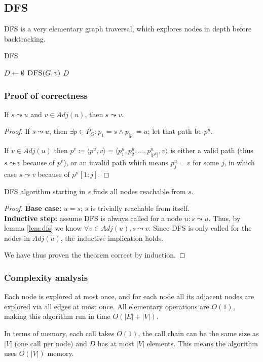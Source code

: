 \subsection{\texorpdfstring{\Acrlong*{DFS}}{Depth-first search}} \label{algorithm-reachability-dfs}
\Acrlong*{DFS} is a very elementary graph traversal, which explores nodes in depth before backtracking.
\begin{algorithm}[h]
    \caption{\Acrlong*{DFS}}
    \label{alg-dfs}
    \begin{algorithmic}[1]
        \State $D \gets \emptyset$
             \Return {$ $}
            \EndIf 
             {$\Call{DFS}{G, v}$}
            \EndFor
            \State \Return $D$
        \EndFunction
    \end{algorithmic}
\end{algorithm}
\subsubsection{Proof of correctness}
\begin{lemma} \label{lem:dfs}
    If $s \leadsto u$ and $v \in Adj(u)$, then $s \leadsto v$.
\end{lemma}
\begin{proof}
    If $s \leadsto u$, then $\exists p \in P_G \colon p_1 = s \wedge p_{|p|} = u$; let that path be $p^u$.\par
    If $v \in Adj(u)$ then $p^v \coloneqq \langle p^u, v \rangle = \langle p^u_1, p^u_2,...,p^u_{|p^u|}, v\rangle$ is either a valid path (thus $s \leadsto v$ because of $p^v$), or an invalid path which means $p^u_j = v$ for some $j$, in which case $s \leadsto v$ because of $p^u[1:j]$.
\end{proof}
\vspace{2em}
\begin{theorem} \label{teor:dfs}
    \Acrlong*{DFS} algorithm starting in $s$ finds all nodes reachable from $s$.
\end{theorem}
\begin{proof} \textbf{Base case:} $u=s$; $s$ is trivially reachable from itself. \\
\textbf{Inductive step:} assume \textsc{DFS} is always called for a node $u \colon s \leadsto u$. Thus, by lemma \ref{lem:dfs} we know $\forall v \in Adj(u), s \leadsto v$. Since \textsc{DFS} is only called for the nodes in $Adj(u)$, the inductive implication holds.\par
We have thus proven the theorem correct by induction.
\end{proof}
\subsubsection{Complexity analysis}
Each node is explored at most once, and for each node all its adjacent nodes are explored via all edges at most once. All elementary operations are $O(1)$, making this algorithm run in time $O(|E|+|V|)$.\par
In terms of memory, each call takes $O(1)$, the call chain can be the same size as $|V|$ (one call per node) and $D$ has at most $|V|$ elements. This means the algorithm uses $O(|V|)$ memory.
